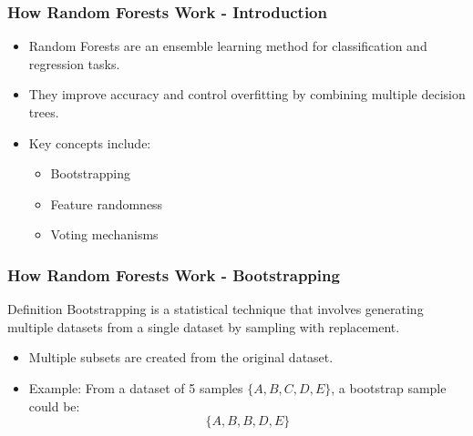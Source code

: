 \documentclass{beamer}
\begin{document}
\begin{frame}[fragile]
    \frametitle{How Random Forests Work - Introduction}
    \begin{itemize}
        \item Random Forests are an ensemble learning method for classification and regression tasks.
        \item They improve accuracy and control overfitting by combining multiple decision trees.
        \item Key concepts include:
        \begin{itemize}
            \item Bootstrapping
            \item Feature randomness
            \item Voting mechanisms
        \end{itemize}
    \end{itemize}
\end{frame}

\begin{frame}[fragile]
    \frametitle{How Random Forests Work - Bootstrapping}
    \begin{block}{Definition}
        Bootstrapping is a statistical technique that involves generating multiple datasets from a single dataset by sampling with replacement.
    \end{block}
    \begin{itemize}
        \item Multiple subsets are created from the original dataset.
        \item Example: From a dataset of 5 samples $\{ A, B, C, D, E \}$, a bootstrap sample could be:
        \[
            \{ A, B, B, D, E \}
        \]
    \end{itemize}
\end{frame}
\end{document}
